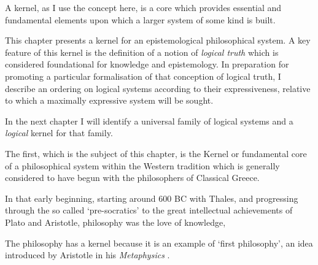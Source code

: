 A kernel, as I use the concept here, is a core which provides essential and fundamental elements upon which a larger system of some kind is built.

This chapter presents a kernel for an epistemological philosophical system.
A key feature of this kernel is the definition of a notion of \emph{logical truth} which is considered foundational for knowledge and epistemology.
In preparation for promoting a particular formalisation of that conception of logical truth, I describe an ordering on logical systems according to their expressiveness, relative to which a maximally expressive system will be sought.

In the next chapter I will identify a universal family of logical systems and a \emph{logical} kernel for that family.

The first, which is the subject of this chapter, is the Kernel or fundamental core of a philosophical system within the Western tradition which is generally considered to have begun with the philosophers of Classical Greece.

In that early beginning, starting around 600 BC with Thales, and progressing through the so called `pre-socratics' to the great intellectual achievements of Plato and Aristotle, philosophy was the love of knowledge, 

The philosophy has a kernel because it is an example of `first philosophy', an idea introduced by Aristotle in his \emph{Metaphysics} \cite{aristotleMetap}.

